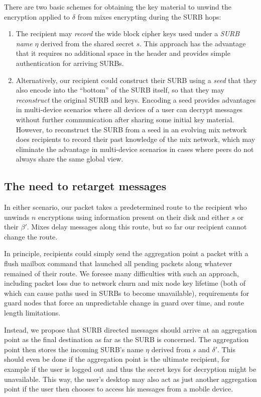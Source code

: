 \documentclass[twoside,letterpaper]{llncs}
\begin{document}
There are two basic schemes for obtaining the key material to
unwind the encryption applied to $\delta$ from mixes encrypting
during the SURB hops:

\begin{enumerate}
 \item The recipient may {\em record} the wide block cipher keys used
   under a {\it SURB name} $\eta$ derived from the shared secret $s$.
   This approach has the advantage that it requires no additional
   space in the header and provides simple authentication for arriving
   SURBs.

 \item Alternatively, our recipient could construct their SURB using a
   {\em seed} that they also encode into the ``bottom'' of the SURB
   itself, so that they may {\em reconstruct} the original SURB and
   keys.  Encoding a seed provides advantages in multi-device
   scenarios where all devices of a user can decrypt messages without
   further communication after sharing some initial key material.
   However, to reconstruct the SURB from a seed in an evolving
   mix network does recipients to record their past knowledge of
   the mix network, which may eliminate the advantage in multi-device
   scenarios in cases where peers do not always share the same global
   view.
\end{enumerate}


\subsection{The need to retarget messages}

In either scenario, our packet takes a predetermined route to the
recipient who unwinds $n$ encryptions using information present on
their disk and either $s$ or their $\beta'$.  Mixes delay
messages along this route, but so far our recipient cannot change
the route. 

In principle, recipients could simply send the aggregation point
a packet with a flush mailbox command that launched all pending
packets along whatever remained of their route.  We foresee many
difficulties with such an approach, including packet loss due to
network churn and mix node key lifetime (both of which can cause
paths used in SURBs to become unavailable), requirements for guard
nodes that force an unpredictable change in guard over time,
and route length limitations.

Instead, we propose that SURB directed messages should arrive at
an aggregation point as the final destination as far as the SURB
is concerned. The aggregation point then stores 
the incoming SURB's name $\eta$ derived from $s$ and $\delta'$.
This should even be done if the aggregation point is the ultimate
recipient, for example if the user is logged out and thus the
secret keys for decryption might be unavailable.  This way, the
user's desktop may also act as just another aggregation point if
the user then chooses to access his messages from a mobile device.
\end{document}
